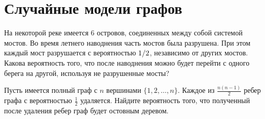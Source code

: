 \section{Случайные модели графов}

\begin{problem}

На некоторой реке имеется 6 островов, соединенных между собой системой мостов. Во время летнего наводнения часть мостов была разрушена. При этом каждый мост разрушается с вероятностью ${1\mathord{\left/ {\vphantom {1 2}} \right. \kern-\nulldelimiterspace} 2} $, независимо от других мостов. Какова вероятность того, что после наводнения можно будет перейти с одного берега на другой, используя не разрушенные мосты?


\end{problem}

\begin{problem}

Пусть имеется полный граф с $n$ вершинами $\{1,2,\ldots ,n\}$. Каждое из 
$\frac{n(n-1)}{2}$ ребер графа с вероятностью $\frac{1}{2}$ удаляется. 
Найдите вероятность того, что полученный после удаления ребер граф будет 
остовным деревом.

\end{problem}


